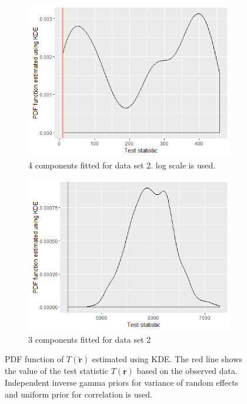 \begin{figure}[!htb]
	\centering
	\captionsetup{justification=centering}
	\begin{subfigure}[b]{0.4\textwidth}
		\includegraphics[width=\textwidth]{mainmatter/chapter_5_simulation_study/indpGammaPrior_ppc_3wellsep4comp.png}
        \caption{\label{fig : ppc_3wellsep4comp_indp_gammaprior}4 components fitted for data set 2. log scale is used.}
	\end{subfigure}
	\begin{subfigure}[b]{0.4\textwidth}
		\includegraphics[width=\textwidth]{mainmatter/chapter_5_simulation_study/indpGammaPrior_ppc_3wellsep3comp.png}
        \caption{\label{fig : ppc_3wellsep3comp_indp_gammaprior}3 components fitted for data set 2}
	\end{subfigure}
	\caption{PDF function of $T(\boldsymbol{\tilde{r}})$ estimated using KDE. The red line shows the value of the test statistic $T(\boldsymbol{r})$ based on the observed data. Independent inverse gamma priors for variance of random effects and uniform prior for correlation is used.}
	\label{fig : ppc_3wellsepcomp_indp_gammaprior}
\end{figure}